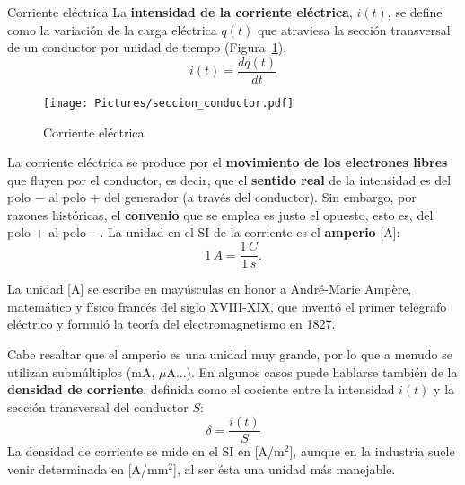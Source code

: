 \documentclass[11pt]{book} %
\makeatletter
\numberwithin{dummy}{section}
\theoremstyle{ocrenumbox}
\theoremstyle{blacknumex}
\theoremstyle{blacknumbox}
\theoremstyle{ocrenum}
\newenvironment{remark}{\par\vspace{10pt}\small %
\begin{list}{}{
\leftmargin=35pt %
\rightmargin=25pt}\item\ignorespaces %
\makebox[-2.5pt]{\begin{tikzpicture}[overlay]
\node[draw=ocre!60,line width=1pt,circle,fill=ocre!25,font=\sffamily\bfseries,inner sep=2pt,outer sep=0pt] at (-15pt,0pt){\textcolor{ocre}{N}};\end{tikzpicture}} %
\advance\baselineskip -1pt}{\end{list}\vskip5pt} %
\renewcommand{\subsubsection}{\@startsection {subsubsection}{3}{\z@}
{-2ex \@plus -0.1ex \@minus -.2ex}
{.2ex \@plus.2ex }
{\normalfont\small\sffamily\bfseries}}
\newlength\esp
\makeatother
\begin{document}
	\subsubsection{Corriente eléctrica}
	La \textbf{intensidad de la corriente eléctrica}, $i(t)$, se define como la variación de la carga eléctrica $q(t)$ que atraviesa la sección transversal de un conductor por unidad de tiempo (Figura~\ref{fig.seccion_conductor}). 
	\begin{equation*}\label{eq.intensidad}
		i(t)=\dfrac{dq(t)}{dt}
	\end{equation*}
	\begin{figure}[htbp]
		\centering
		\texttt{[image: Pictures/seccion\_conductor.pdf]}
		\caption{Corriente eléctrica}
		\label{fig.seccion_conductor}
	\end{figure}
	
	La corriente eléctrica se produce por el \textbf{movimiento de los electrones libres} que fluyen por el conductor, es decir, que el \textbf{sentido real} de la intensidad es del polo $-$ al polo $+$ del generador (a través del conductor). Sin embargo, por razones históricas, el \textbf{convenio} que se emplea es justo el opuesto, esto es, del polo $+$ al polo $-$. La unidad en el SI de la corriente es el \textbf{amperio} [A]: 
	\begin{equation*}
		1\,A =\dfrac{1\,C}{1\,s}.
	\end{equation*}
	\begin{remark}
		La unidad [A] se escribe en mayúsculas en honor a André-Marie Ampère, matemático y físico francés del siglo XVIII-XIX, que inventó el primer telégrafo eléctrico y formuló la teoría del electromagnetismo en 1827.
	\end{remark}
	
	Cabe resaltar que el amperio es una unidad muy grande, por lo que a menudo se utilizan submúltiplos (mA, $\mu$A...). En algunos casos puede hablarse también de la \textbf{densidad de corriente}, definida como el cociente entre la intensidad $i(t)$ y la sección transversal del conductor $S$:
	\begin{equation*}
		\delta =\dfrac{i(t)}{S}
	\end{equation*}
	La densidad de corriente se mide en el SI en [A/m$^2$], aunque en la industria suele venir determinada en [A/mm$^2$], al ser ésta una unidad más manejable.
	
\end{document}
